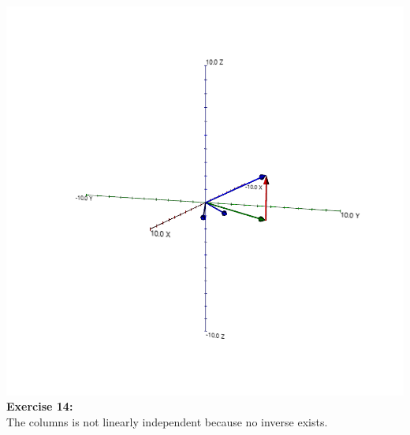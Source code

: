 \documentclass[10pt]{article}
\begin{document}
	\includegraphics[scale=0.3]{module7_exercise13}
	\\
	
	\textbf{\large Exercise 14:}\\
	The columns is not linearly independent because no inverse exists.
	\\
	
\end{document}
